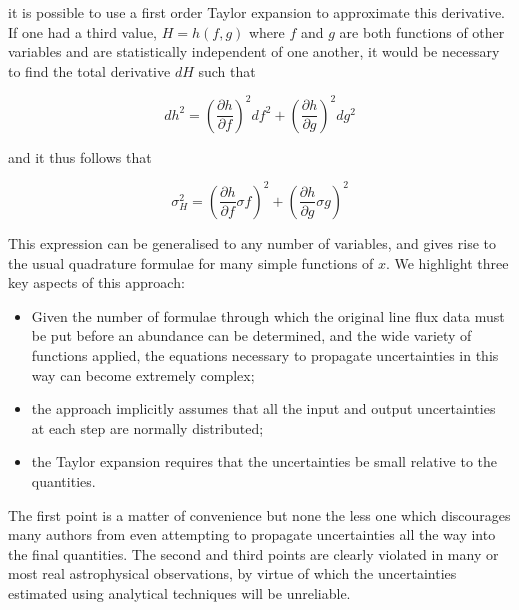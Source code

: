 \documentclass[useAMS,usenatbib]{mn2e}
\begin{document}
it is possible to use a first order Taylor expansion to approximate this derivative.  If one had a third value, $H = h(f, g)$ where $f$ and $g$ are both functions of other variables and are statistically independent of one another, it would be necessary to find the total derivative $dH$ such that

\begin{equation}
dh^2 = \left(\frac{\partial h}{\partial f}\right)^2df^2 + \left(\frac{\partial h}{\partial g}\right)^2dg^2
\end{equation}

and it thus follows that

\begin{equation}
\sigma^2_H = \left(\frac{\partial h}{\partial f}\sigma f\right)^2 + \left(\frac{\partial h}{\partial g}\sigma g\right)^2
\end{equation}

This expression can be generalised to any number of variables, and gives rise to the usual quadrature formulae for many simple functions of $x$.  We highlight three key aspects of this approach:

\begin{itemize}
  \item Given the number of formulae through which the original line flux data must be put before an abundance can be determined, and the wide variety of functions applied, the equations necessary to propagate uncertainties in this way can become extremely complex;
  \item the approach implicitly assumes that all the input and output uncertainties at each step are normally distributed;
  \item the Taylor expansion requires that the uncertainties be small relative to the quantities.
\end{itemize}

The first point is a matter of convenience but none the less one which discourages many authors from even attempting to propagate uncertainties all the way into the final quantities.  The second and third points are clearly violated in many or most real astrophysical observations, by virtue of which the uncertainties estimated using analytical techniques will be unreliable.
\end{document}
